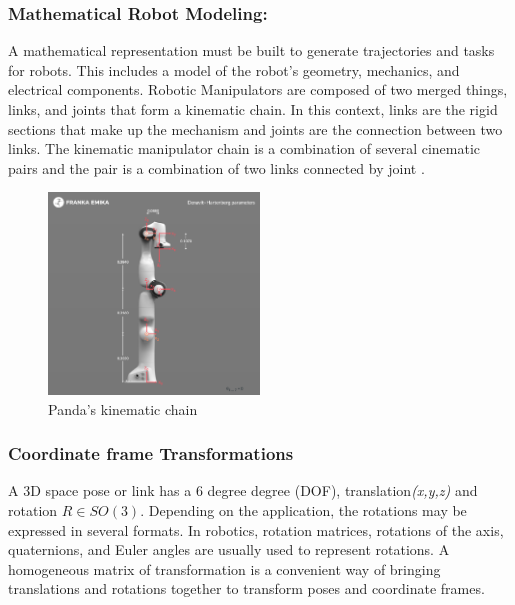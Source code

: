 \subsubsection*{Mathematical Robot Modeling:}
A mathematical representation must be built to generate trajectories and tasks for robots. This includes a model of the robot's geometry, mechanics, and electrical components\cite{zheng_mathematical_1985}. %
Robotic Manipulators are composed of two merged things, links, and joints that form a kinematic chain. In this context, links are the rigid sections that make up the mechanism and joints are the connection between two links. The kinematic manipulator chain is a combination of several cinematic pairs and the pair is a combination of two links connected by joint \cite{al-naimi_robotics_2018}.

\begin{figure}[h]
  \centering
  \includegraphics[width=0.5\textwidth]{graphics/pandakinematicchain.png}
  \caption{Panda’s kinematic chain \cite{noauthor_robot_2017}}
  \label{fig:pandachain}
\end{figure}

\subsubsection*{Coordinate frame Transformations}
A 3D space pose or link has a 6 degree degree (DOF), translation\textit{(x,y,z)} and rotation $R \in SO(3)$. Depending on the application, the rotations may be expressed in several formats. 
In robotics, rotation matrices, rotations of the axis, quaternions, and Euler angles are usually used to represent rotations.
A homogeneous matrix of transformation is a convenient way of bringing translations and rotations together to transform poses and coordinate frames\cite{cai_coordinate_2011}.

